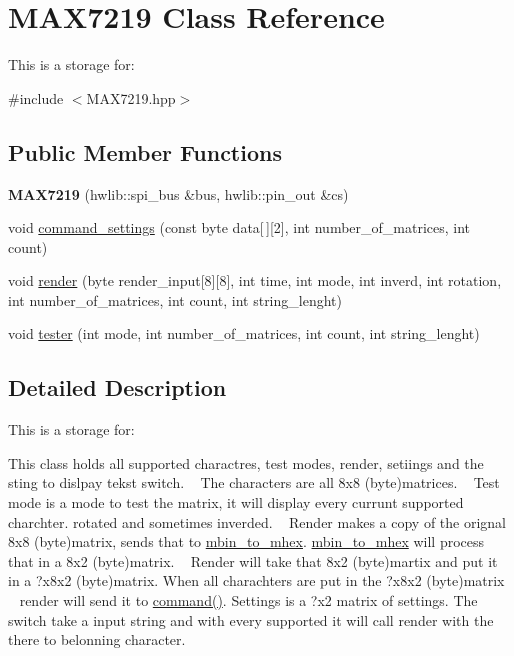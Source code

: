 \hypertarget{class_m_a_x7219}{}\section{M\+A\+X7219 Class Reference}
\label{class_m_a_x7219}


This is a storage for\+:  




{\ttfamily \#include $<$M\+A\+X7219.\+hpp$>$}

\subsection*{Public Member Functions}
\begin{DoxyCompactItemize}
\item 
{\bfseries M\+A\+X7219} (hwlib\+::spi\+\_\+bus \&bus, hwlib\+::pin\+\_\+out \&cs)\hypertarget{class_m_a_x7219_a624c96ba355adf98508467ff5ba1231c}{}\label{class_m_a_x7219_a624c96ba355adf98508467ff5ba1231c}

\item 
void \hyperlink{class_m_a_x7219_ac71364c86fbc0e9ab520c751dfe3aef0}{command\+\_\+settings} (const byte data\mbox{[}$\,$\mbox{]}\mbox{[}2\mbox{]}, int number\+\_\+of\+\_\+matrices, int count)
\item 
void \hyperlink{class_m_a_x7219_a22dc3d4ba386b338de95d622c39e7158}{render} (byte render\+\_\+input\mbox{[}8\mbox{]}\mbox{[}8\mbox{]}, int time, int mode, int inverd, int rotation, int number\+\_\+of\+\_\+matrices, int count, int string\+\_\+lenght)
\item 
void \hyperlink{class_m_a_x7219_ab6289ee1c88108080083b26cd1b54579}{tester} (int mode, int number\+\_\+of\+\_\+matrices, int count, int string\+\_\+lenght)
\end{DoxyCompactItemize}


\subsection{Detailed Description}
This is a storage for\+: 

This class holds all supported charactres, test modes, render, setiings and the sting to dislpay tekst switch. ~\newline
The characters are all 8x8 (byte)matrices. ~\newline
Test mode is a mode to test the matrix, it will display every currunt supported charchter. rotated and sometimes inverded. ~\newline
Render makes a copy of the orignal 8x8 (byte)matrix, sends that to \hyperlink{classmbin__to__mhex}{mbin\+\_\+to\+\_\+mhex}. \hyperlink{classmbin__to__mhex}{mbin\+\_\+to\+\_\+mhex} will process that in a 8x2 (byte)matrix. ~\newline
Render will take that 8x2 (byte)martix and put it in a ?x8x2 (byte)matrix. When all charachters are put in the ?x8x2 (byte)matrix ~\newline
render will send it to \hyperlink{classcommand}{command()}. Settings is a ?x2 matrix of settings. The switch take a input string and with every supported it will call render with the there to belonning character. 


